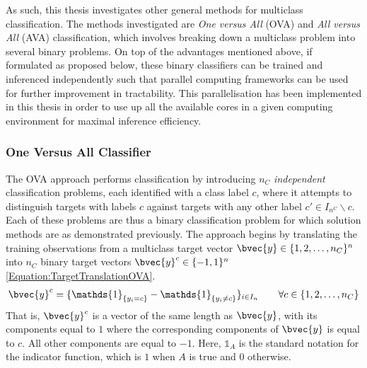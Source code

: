 			As such, this thesis investigates other general methods for multiclass classification. The methods investigated are \textit{One versus All} (OVA) and \textit{All versus All} (AVA) classification, which involves breaking down a multiclass problem into several binary problems. On top of the advantages mentioned above, if formulated as proposed below, these binary classifiers can be trained and inferenced independently such that parallel computing frameworks can be used for further improvement in tractability. This parallelisation has been implemented in this thesis in order to use up all the available cores in a given computing environment for maximal inference efficiency.
	
			\subsubsection{One Versus All Classifier}
			\label{BenthicHabitatMapping:Classification:MulticlassClassification:OVA}
						
				The OVA approach performs classification by introducing $n_{C}$ \textit{independent} classification problems, each identified with a class label $c$, where it attempts to distinguish targets with labels $c$ against targets with any other label $c' \in I_{n^{C}} \backslash c$. Each of these problems are thus a binary classification problem for which solution methods are as demonstrated previously. The approach begins by translating the training observations from a multiclass target vector $\bvec{y} \in \{1, 2, \dots, n_{C}\}^{n}$ into $n_{C}$ binary target vectors $\bvec{y}^{c} \in \{-1, 1\}^{n}$ \eqref{Equation:TargetTranslationOVA}. \begin{equation}
					\bvec{y}^{c} = \{\mathds{1}_{\{y_{i} = c\}} - \mathds{1}_{\{y_{i} \neq c\}}\}_{i \in I_{n}} \qquad \forall c \in \{1, 2, \dots, n_{C}\}
				\label{Equation:TargetTranslationOVA}
				\end{equation} That is, $\bvec{y}^{c}$ is a vector of the same length as $\bvec{y}$, with its components equal to $1$ where the corresponding components of $\bvec{y}$ is equal to $c$. All other components are equal to $-1$. Here, $\mathds{1}_{A}$ is the standard notation for the indicator function, which is $1$ when $A$ is true and $0$ otherwise.
				
